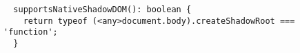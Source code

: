\begin{verbatim}
  supportsNativeShadowDOM(): boolean {
    return typeof (<any>document.body).createShadowRoot === 'function';
  }
\end{verbatim}
